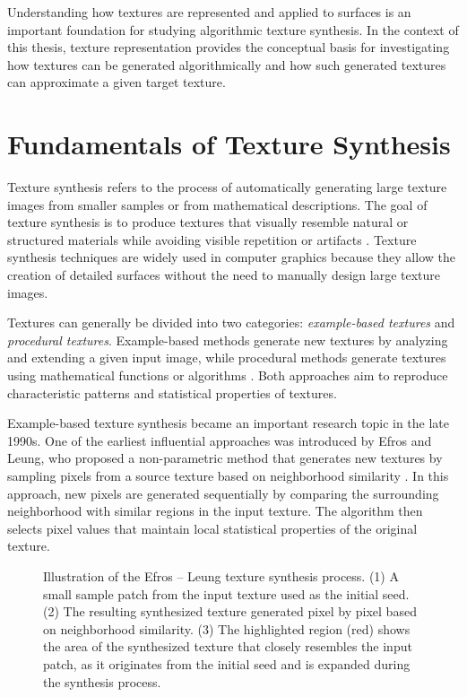 Understanding how textures are represented and applied to surfaces is an important foundation for studying algorithmic texture synthesis. In the context of this thesis, texture representation provides the conceptual basis for investigating how textures can be generated algorithmically and how such generated textures can approximate a given target texture.

\section{Fundamentals of Texture Synthesis}

Texture synthesis refers to the process of automatically generating large texture images from smaller samples or from mathematical descriptions. The goal of texture synthesis is to produce textures that visually resemble natural or structured materials while avoiding visible repetition or artifacts \cite{ebert2003texturing}. Texture synthesis techniques are widely used in computer graphics because they allow the creation of detailed surfaces without the need to manually design large texture images.

Textures can generally be divided into two categories: \textit{example-based textures} and \textit{procedural textures}. Example-based methods generate new textures by analyzing and extending a given input image, while procedural methods generate textures using mathematical functions or algorithms \cite{akenine2018realtime}. Both approaches aim to reproduce characteristic patterns and statistical properties of textures.

Example-based texture synthesis became an important research topic in the late 1990s. One of the earliest influential approaches was introduced by Efros and Leung, who proposed a non-parametric method that generates new textures by sampling pixels from a source texture based on neighborhood similarity \cite{efros1999texturesynthesis}. In this approach, new pixels are generated sequentially by comparing the surrounding neighborhood with similar regions in the input texture. The algorithm then selects pixel values that maintain local statistical properties of the original texture.

\begin{figure}[H]
    \centering
    {Illustration of the Efros -- Leung texture synthesis process. (1) A small sample patch from the input texture used as the initial seed. (2) The resulting synthesized texture generated pixel by pixel based on neighborhood similarity. (3) The highlighted region (red) shows the area of the synthesized texture that closely resembles the input patch, as it originates from the initial seed and is expanded during the synthesis process.}
    \label{fig:efros-and-leung-comparison}
\end{figure}

